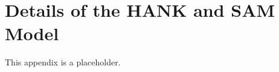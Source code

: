 \documentclass[\latexroot/\projectname]{subfiles}
\begin{document}
\FloatBarrier
\section{Details of the HANK and SAM Model}
\whenintegrated{\label{sec:appendix-hank}} %

This appendix is a placeholder.

\smartbib
\end{document}
